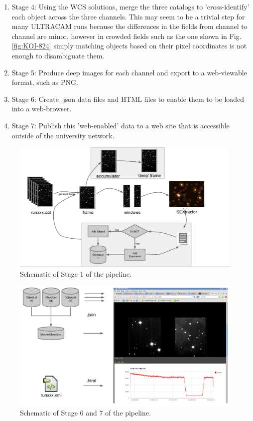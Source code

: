 \begin{enumerate}
	\item Stage 4: Using the WCS solutions, merge the three catalogs to 'cross-identify' each object across the three channels. This may seem to be a trivial step for many ULTRACAM runs because the differences in the fields from channel to channel are minor, however in crowded fields such as the one shown in Fig. \ref{fig:KOI-824} simply matching objects based on their pixel coordinates is not enough to disambiguate them.
	\item Stage 5: Produce deep images for each channel and export to a web-viewable format, such as PNG. 
	\item Stage 6: Create .json data files and HTML files to enable them to be loaded into a web-browser.
	\item Stage 7: Publish this 'web-enabled' data to a web site that is accessible outside of the university network.  
		
\end{enumerate}

\begin{figure}[!h]
	\centering
	\includegraphics[width=130mm]{images/flowchart.png}
	\caption{Schematic of Stage 1 of the pipeline.}
	\label{flowchart}
\end{figure}


\begin{figure}[!h]
	\centering
	\includegraphics[width=130mm]{images/webpublish.png}
	\caption{Schematic of Stage 6 and 7 of the pipeline.}
	\label{webpublish}
\end{figure}


